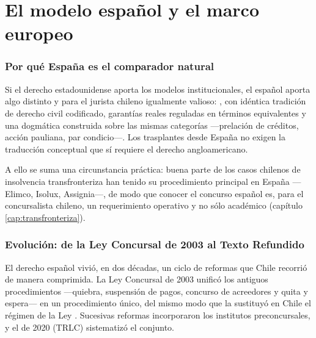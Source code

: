 \chapter{El modelo español y el marco europeo}
\label{cap:comparado-espana}


\bloqueTeorico

\subsection{Por qué España es el comparador natural}

Si el derecho estadounidense aporta los modelos institucionales, el español aporta algo distinto y
para el jurista chileno igualmente valioso: , con idéntica tradición de derecho civil codificado, garantías reales reguladas en
términos equivalentes y una dogmática construida sobre las mismas categorías ---prelación de
créditos, acción pauliana, par condicio---. Los trasplantes desde España no exigen la traducción
conceptual que sí requiere el derecho angloamericano.

A ello se suma una circunstancia práctica: buena parte de los casos chilenos de insolvencia
transfronteriza han tenido su procedimiento principal en España ---Elimco, Isolux, Assignia---, de
modo que conocer el concurso español es, para el concursalista chileno, un requerimiento operativo
y no sólo académico (capítulo \ref{cap:transfronteriza}).

\subsection{Evolución: de la Ley Concursal de 2003 al Texto Refundido}

El derecho español vivió, en dos décadas, un ciclo de reformas que Chile recorrió de manera
comprimida. La Ley Concursal de 2003 unificó los antiguos procedimientos ---quiebra, suspensión de
pagos, concurso de acreedores y quita y espera--- en un procedimiento único, del mismo modo que la
\LIR{} sustituyó en Chile el régimen de la Ley . Sucesivas reformas incorporaron los
institutos preconcursales, y el  de 2020 (TRLC)
sistematizó el conjunto.

